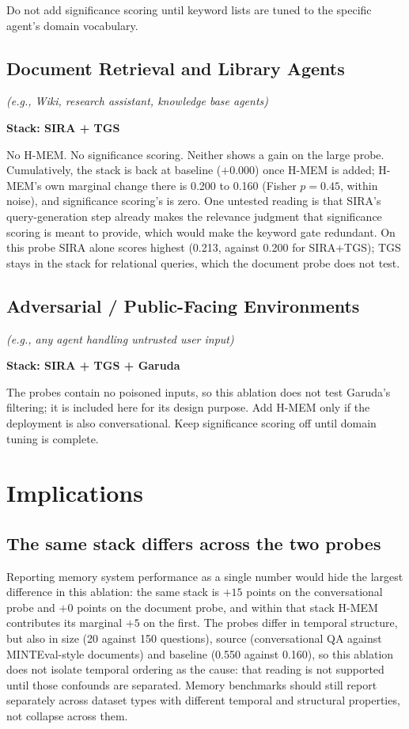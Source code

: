 \documentclass[11pt,a4paper]{article}
\begin{document}
Do not add significance scoring until keyword lists are tuned to the specific agent's domain vocabulary.

\subsection{Document Retrieval and Library Agents}
\textit{(e.g., Wiki, research assistant, knowledge base agents)}

\textbf{Stack: SIRA + TGS}

No H-MEM. No significance scoring. Neither shows a gain on the large probe. Cumulatively, the stack is back at baseline ($+0.000$) once H-MEM is added; H-MEM's own marginal change there is 0.200 to 0.160 (Fisher $p=0.45$, within noise), and significance scoring's is zero. One untested reading is that SIRA's query-generation step already makes the relevance judgment that significance scoring is meant to provide, which would make the keyword gate redundant. On this probe SIRA alone scores highest (0.213, against 0.200 for SIRA+TGS); TGS stays in the stack for relational queries, which the document probe does not test.

\subsection{Adversarial / Public-Facing Environments}
\textit{(e.g., any agent handling untrusted user input)}

\textbf{Stack: SIRA + TGS + Garuda}

The probes contain no poisoned inputs, so this ablation does not test Garuda's filtering; it is included here for its design purpose. Add H-MEM only if the deployment is also conversational. Keep significance scoring off until domain tuning is complete.

\section{Implications}

\subsection{The same stack differs across the two probes}

Reporting memory system performance as a single number would hide the largest difference in this ablation: the same stack is $+15$ points on the conversational probe and $+0$ points on the document probe, and within that stack H-MEM contributes its marginal $+5$ on the first. The probes differ in temporal structure, but also in size (20 against 150 questions), source (conversational QA against MINTEval-style documents) and baseline (0.550 against 0.160), so this ablation does not isolate temporal ordering as the cause: that reading is not supported until those confounds are separated. Memory benchmarks should still report separately across dataset types with different temporal and structural properties, not collapse across them.
\end{document}
